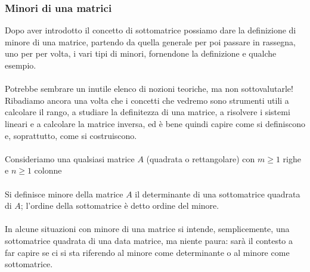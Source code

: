 \documentclass{report}
\begin{document}
\subsubsection{Minori di una matrici}

Dopo aver introdotto il concetto di sottomatrice possiamo dare la definizione di minore di una matrice, partendo da quella generale per poi passare in rassegna, uno per per volta, i vari tipi di minori, fornendone la definizione e qualche esempio.
\\
\\
Potrebbe sembrare un inutile elenco di nozioni teoriche, ma non sottovalutarle! Ribadiamo ancora una volta che i concetti che vedremo sono strumenti utili a calcolare il rango, a studiare la definitezza di una matrice, a risolvere i sistemi lineari e a calcolare la matrice inversa, ed è bene quindi capire come si definiscono e, soprattutto, come si costruiscono.
\\
\\
Consideriamo una qualsiasi matrice $A$ (quadrata o rettangolare) con $m \ge 1$ righe e $n \ge 1$ colonne
\\
\\
Si definisce minore della matrice $A$ il determinante di una sottomatrice quadrata di $A$; l'ordine della sottomatrice è detto ordine del minore.
\\
\\
In alcune situazioni con minore di una matrice si intende, semplicemente, una sottomatrice quadrata di una data matrice, ma niente paura: sarà il contesto a far capire se ci si sta riferendo al minore come determinante o al minore come sottomatrice.
\\
\\
\end{document}
